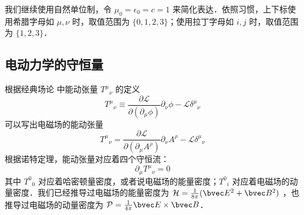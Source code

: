 
我们继续使用自然单位制，令 $\mu_0=\epsilon_0=c=1$ 来简化表达．依照习惯，上下标使用希腊字母如 $\mu, \nu$ 时，取值范围为 $\{0, 1, 2, 3\}$；使用拉丁字母如 $i, j$ 时，取值范围为 $\{1, 2, 3\}$．

\subsection{电动力学的守恒量}
根据经典场论 中能动张量 ${T^\mu}_\nu$ 的定义
\begin{equation}
T^\mu{}_\nu \equiv \frac{\partial \mathcal L}{\partial (\partial_\mu \phi)} \partial_\nu \phi - \mathcal L \delta^\mu{}_\nu
\end{equation}
可以写出电磁场的能动张量
\begin{equation}
T^\mu{}_\nu =\frac{\partial \mathcal L}{\partial (\partial_\mu A^\rho)} \partial_\nu A^\rho - \mathcal L \delta^\mu{}_\nu
\end{equation}
根据诺特定理，能动张量对应着四个守恒流：
\begin{equation}
\partial_\mu T^\mu{}_\nu=0
\end{equation}
其中 $T^0{}_0$ 对应着哈密顿量密度，或者说电磁场的能量密度；$T^0{}_i$ 对应着电磁场的动量密度．我们已经推导过电磁场的能量密度为 $\mathcal H=\frac{1}{8\pi}(\bvec E^2+\bvec B^2)$ ，也推导过电磁场的动量密度为 $\mathcal P=\frac{1}{4\pi} \bvec E\times \bvec B$．